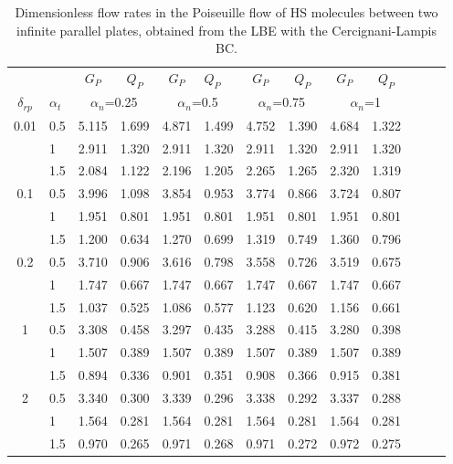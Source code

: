 \begin{table}[t]
	\centering
	\caption{Dimensionless flow rates in the Poiseuille flow of HS molecules
		between two infinite parallel plates, obtained from the LBE with the
		Cercignani-Lampis  BC. }
	\begin{tabular}{clccclccccccc}
		\hline
		&  & ${G}_P$ & ${Q}_P$ & ${G}_P$ & ${Q}_P$ & ${G}_P$ & ${Q}_P$ & ${G}_P$
		& ${Q}_P$  \\ 
		$\delta_{rp}$ & $\alpha_t$ & \multicolumn{2}{c}{$\alpha_n$=0.25} & 
		\multicolumn{2}{c}{$\alpha_n$=0.5} & \multicolumn{2}{c}{$\alpha_n$=0.75} & 
		\multicolumn{2}{c}{$\alpha_n$=1} & 
		\\ 
		\hline
		0.01 & 0.5 & 5.115 & 1.699 & 4.871 & 1.499 & 4.752 & 1.390 & 4.684 & 1.322 &  \\ 
		& 1 & 2.911 & 1.320 & 2.911 & 1.320 & 2.911 & 1.320 & 2.911 & 1.320 &   \\ 
		& 1.5 & 2.084 & 1.122 & 2.196 & 1.205 & 2.265 & 1.265 & 2.320 & 1.319 &   \\ 
		0.1 & 0.5 & 3.996 & 1.098 & 3.854 & 0.953 & 3.774 & 0.866 & 3.724 & 0.807 & 
		\\ 
		& 1 & 1.951 & 0.801 & 1.951 & 0.801 & 1.951 & 0.801 & 1.951 & 0.801 &  \\ 
		& 1.5 & 1.200 & 0.634 & 1.270 & 0.699 & 1.319 & 0.749 & 1.360 & 0.796 &   \\ 
		0.2 & 0.5 & 3.710 & 0.906 & 3.616 & 0.798 & 3.558 & 0.726 & 3.519 & 0.675 &   \\ 
		& 1 & 1.747 & 0.667 & 1.747 & 0.667 & 1.747 & 0.667 & 1.747 & 0.667 &   \\ 
		& 1.5 & 1.037 & 0.525 & 1.086 & 0.577 & 1.123 & 0.620 & 1.156 & 0.661 &    \\ 
		1 & 0.5 & 3.308 & 0.458 & 3.297 & 0.435 & 3.288 & 0.415 & 3.280 & 0.398 &   \\ 
		& 1 & 1.507 & 0.389 & 1.507 & 0.389 & 1.507 & 0.389 & 1.507 & 0.389 &   \\ 
		& 1.5 & 0.894 & 0.336 & 0.901 & 0.351 & 0.908 & 0.366 & 0.915 & 0.381 &   \\ 
		2 & 0.5 & 3.340 & 0.300 & 3.339 & 0.296 & 3.338 & 0.292 & 3.337 & 0.288 &   \\ 
		& 1 & 1.564 & 0.281 & 1.564 & 0.281 & 1.564 & 0.281 & 1.564 & 0.281 &  \\ 
		& 1.5 & 0.970 & 0.265 & 0.971 & 0.268 & 0.971 & 0.272 & 0.972 & 0.275 &  \\ 

\end{tabular}
\end{table}
